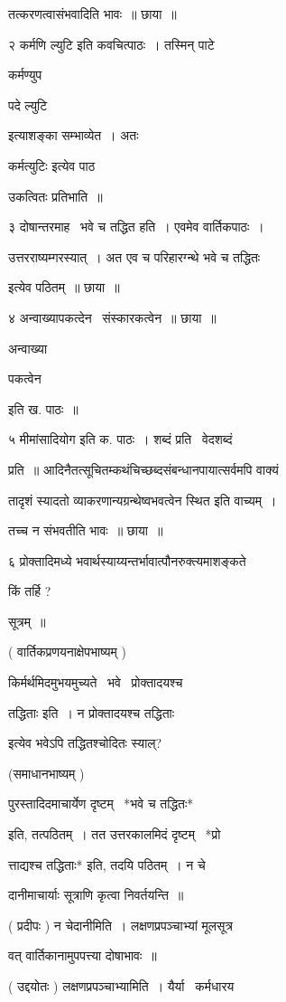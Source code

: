\documentclass[11pt, openany]{book}
\begin{document}
तत्करणत्वासंभवादिति भावः~॥ छाया~॥ 

२ {\qt कर्मणि ल्युटि} इति कवचित्पाठः~। तस्मिन् पाटे {\qt कर्मण्युप \textendash\ 

पदे ल्युटि} इत्याशङ्का सम्भाव्येत~। अतः {\qt कर्मत्युटिः इत्येव पाठ 

उकत्वितः प्रतिभाति~॥}

३ दोषान्तरमाह \textendash\ भवे च तद्धित हति~। एवमेव वार्तिकपाठः~। 

उत्तरराष्यम्गरस्यात्~। अत एव च परिहारग्न्थे {\qt भवे च तद्धितः}

इत्येव पठितम्~॥ छाया~॥ 

४ अन्वाख्यापकत्देन \textendash\ संस्कारकत्वेन~॥ छाया~॥ {\qt अन्वाख्या \textendash\ 

पकत्वेन} इति ख. पाठः~॥ 

५ {\qt मीमांसादियोग} इति क. पाठः~। शब्दं प्रति \textendash\ वेदशब्दं 

प्रति~॥ आदिनैतत्सूचितम्कथंचिच्छब्दसंबन्धानपायात्सर्वमपि वाक्यं 

तादृशं स्यादतो व्याकरणान्यग्रन्थेष्वभवत्वेन स्थित इति वाच्यम्~। 

तच्च न संभवतीति भावः~॥ छाया~॥ 

६ प्रोक्तादिमध्ये भवार्थस्याय्यन्तर्भावात्पौनरुक्त्यमाशङ्कते \textendash\ 



किं तर्हि ? 

सूत्रम्~॥ 

( वार्तिकप्रणयनाक्षेपभाष्यम् ) 

किर्मर्थमिदमुभयमुच्यते \textendash\ भवे \textendash\ प्रोक्तादयश्च 

तद्धिताः इति~। न प्रोक्तादयश्च तद्धिताः 

इत्येव भवेऽपि तद्धितश्चोदितः स्याल्? 

(समाधानभाष्यम् ) 

पुरस्तादिदमाचार्येण दृष्टम् \textendash\ *भवे च तद्धितः* 

इति, तत्पठितम्~। तत उत्तरकालमिदं दृष्टम् \textendash\ *प्रो \textendash\ 

त्ताद्यश्च तद्धिताः* इति, तदयि पठितम्~। न चे \textendash\ 

दानीमाचार्याः सूत्राणि कृत्वा निवर्तयन्ति~॥ 

( प्रदीपः ) न चेदानीमिति~। लक्षणप्रपञ्चाभ्यां मूलसूत्र \textendash\ 

वत् वार्तिकानामुपपत्त्या दोषाभावः~॥ 

( उद्दयोतः ) लक्षणप्रपञ्चाभ्यामिति~। यैर्या \textendash\ कर्मधारय \textendash\ 
\end{document}
